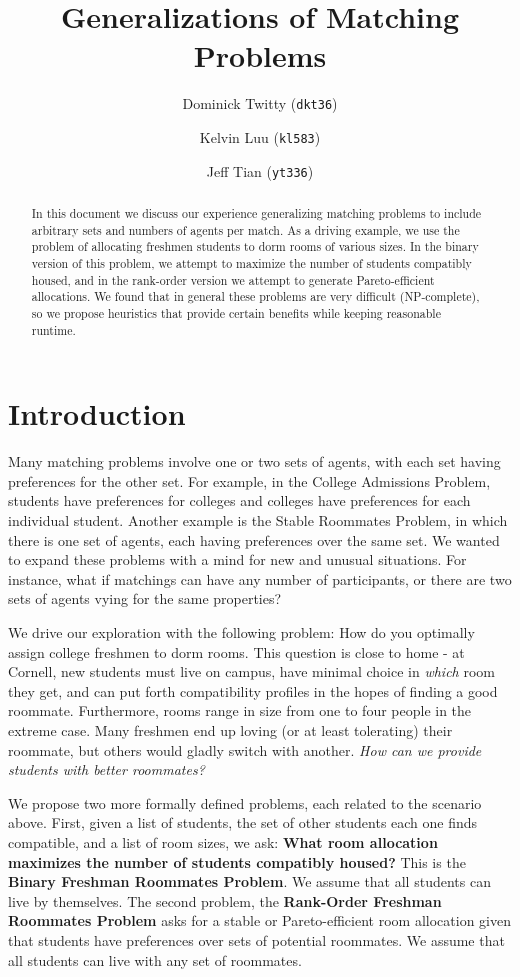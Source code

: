 \documentclass[11pt]{article}
\title{Generalizations of Matching Problems}
\author{Dominick Twitty (\texttt{dkt36})\\
\and Kelvin Luu (\texttt{kl583})\\
\and Jeff Tian (\texttt{yt336})
}
\date{}
\begin{document}
\maketitle

\begin{abstract}
In this document we discuss our experience generalizing matching problems to include arbitrary sets and numbers of agents per match. As a driving example, we use the problem of allocating freshmen students to dorm rooms of various sizes. In the binary version of this problem, we attempt to maximize the number of students compatibly housed, and in the rank-order version we attempt to generate Pareto-efficient allocations. We found that in general these problems are very difficult (NP-complete), so we propose heuristics that provide certain benefits while keeping reasonable runtime.  
\end{abstract}

\section*{Introduction}
Many matching problems involve one or two sets of agents, with each set having preferences for the other set. For example, in the College Admissions Problem, students have preferences for colleges and colleges have preferences for each individual student. Another example is the Stable Roommates Problem, in which there is one set of agents, each having preferences over the same set. We wanted to expand these problems with a mind for new and unusual situations. For instance, what if matchings can have any number of participants, or there are two sets of agents vying for the same properties?

We drive our exploration with the following problem: How do you optimally assign college freshmen to dorm rooms. This question is close to home - at Cornell, new students must live on campus, have minimal choice in \textit{which} room they get, and can put forth compatibility profiles in the hopes of finding a good roommate. Furthermore, rooms range in size from one to four people in the extreme case. Many freshmen end up loving (or at least tolerating) their roommate, but others would gladly switch with another. \textit{How can we provide students with better roommates?}

We propose two more formally defined problems, each related to the scenario above. First, given a list of students, the set of other students each one finds compatible, and a list of room sizes, we ask: \textbf{What room allocation maximizes the number of students compatibly housed?} This is the \textbf{Binary Freshman Roommates Problem}. We assume that all students can live by themselves. The second problem, the \textbf{Rank-Order Freshman Roommates Problem} asks for a stable or Pareto-efficient room allocation given that students have preferences over sets of potential roommates. We assume that all students can live with any set of roommates.
\end{document}
